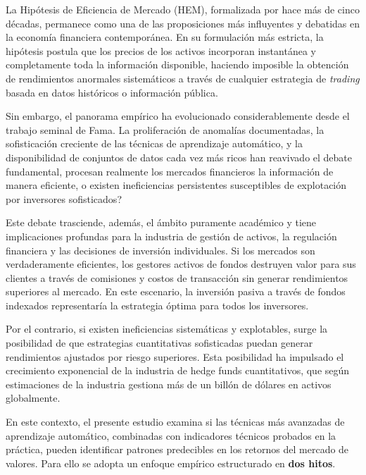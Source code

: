 ﻿\documentclass[11pt,a4paper]{article}
\begin{document}
La Hip\'otesis de Eficiencia de Mercado (HEM), formalizada por \citet{fama1970} hace m\'as de cinco d\'ecadas, permanece como una de las proposiciones m\'as influyentes y debatidas en la econom\'ia financiera contempor\'anea. En su formulaci\'on m\'as estricta, la hip\'otesis postula que los precios de los activos incorporan instant\'anea y completamente toda la informaci\'on disponible, haciendo imposible la obtenci\'on de rendimientos anormales sistem\'aticos a trav\'es de cualquier estrategia de \textit{trading} basada en datos hist\'oricos o informaci\'on p\'ublica.

Sin embargo, el panorama emp\'irico ha evolucionado considerablemente desde el trabajo seminal de Fama. La proliferaci\'on de anomal\'ias documentadas, la sofisticaci\'on creciente de las t\'ecnicas de aprendizaje autom\'atico, y la disponibilidad de conjuntos de datos cada vez m\'as ricos han reavivado el debate fundamental, \textquestiondown procesan realmente los mercados financieros la informaci\'on de manera eficiente, o existen ineficiencias persistentes susceptibles de explotaci\'on por inversores sofisticados?

Este debate trasciende, adem\'as, el \'ambito puramente acad\'emico y tiene implicaciones profundas para la industria de gesti\'on de activos, la regulaci\'on financiera y las decisiones de inversi\'on individuales. Si los mercados son verdaderamente eficientes, los gestores activos de fondos destruyen valor para sus clientes a trav\'es de comisiones y costos de transacci\'on sin generar rendimientos superiores al mercado. En este escenario, la inversi\'on pasiva a trav\'es de fondos indexados representar\'ia la estrategia \'optima para todos los inversores.

Por el contrario, si existen ineficiencias sistem\'aticas y explotables, surge la posibilidad de que estrategias cuantitativas sofisticadas puedan generar rendimientos ajustados por riesgo superiores. Esta posibilidad ha impulsado el crecimiento exponencial de la industria de hedge funds cuantitativos, que seg\'un estimaciones de la industria gestiona m\'as de un bill\'on de d\'olares en activos globalmente.

En este contexto, el presente estudio examina si las t\'ecnicas m\'as avanzadas de aprendizaje autom\'atico, combinadas con indicadores t\'ecnicos probados en la pr\'actica, pueden identificar patrones predecibles en los retornos del mercado de valores. Para ello se adopta un enfoque emp\'irico estructurado en \textbf{dos hitos}.
\end{document}
